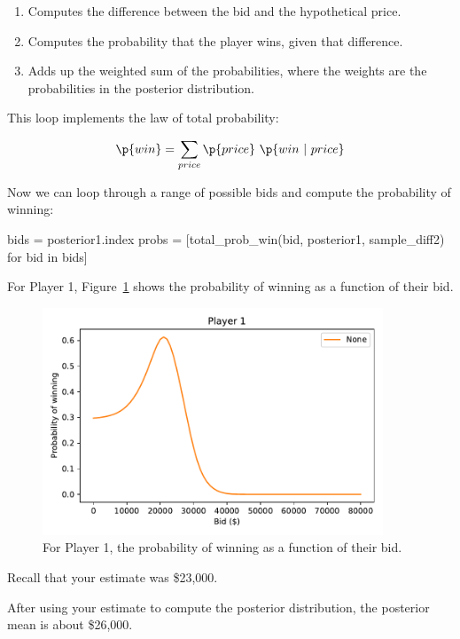 \documentclass[12pt]{book}
\theoremstyle{exercise}
\begin{document}
\begin{enumerate}

\item Computes the difference between the bid and the hypothetical price.

\item Computes the probability that the player wins, given that difference.

\item Adds up the weighted sum of the probabilities, where the weights are the probabilities in the posterior distribution. 

\end{enumerate}

This loop implements the law of total probability:

\[ \p{win} = \sum_{price} \p{price} ~ \p{win ~|~ price} \]

Now we can loop through a range of possible bids and compute the probability of winning:

\begin{code}
bids = posterior1.index
probs = [total_prob_win(bid, posterior1, sample_diff2) 
         for bid in bids]
\end{code}

For Player 1, Figure~\ref{fig08-05} shows the probability of winning as a function of their bid.

\begin{figure}
\centerline{\includegraphics[width=4in]{figs/fig08-05.pdf}}
\caption{For Player 1, the probability of winning as a function of their bid.}
\label{fig08-05}
\end{figure}

Recall that your estimate was \$23,000.

After using your estimate to compute the posterior distribution, the posterior mean is about \$26,000.
\end{document}
